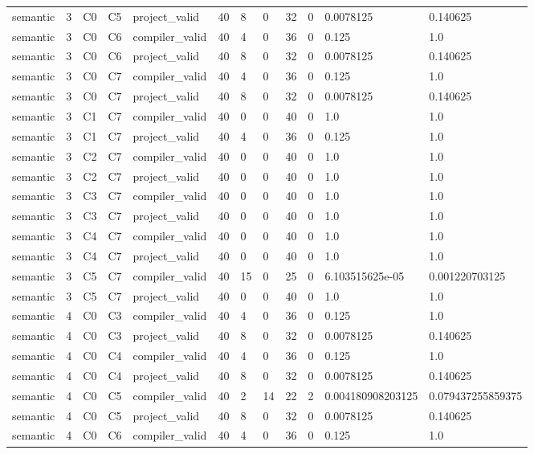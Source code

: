 \begin{tabular}{llllllllllll}
semantic & 3 & C0 & C5 & project\_valid & 40 & 8 & 0 & 32 & 0 & 0.0078125 & 0.140625 \\
semantic & 3 & C0 & C6 & compiler\_valid & 40 & 4 & 0 & 36 & 0 & 0.125 & 1.0 \\
semantic & 3 & C0 & C6 & project\_valid & 40 & 8 & 0 & 32 & 0 & 0.0078125 & 0.140625 \\
semantic & 3 & C0 & C7 & compiler\_valid & 40 & 4 & 0 & 36 & 0 & 0.125 & 1.0 \\
semantic & 3 & C0 & C7 & project\_valid & 40 & 8 & 0 & 32 & 0 & 0.0078125 & 0.140625 \\
semantic & 3 & C1 & C7 & compiler\_valid & 40 & 0 & 0 & 40 & 0 & 1.0 & 1.0 \\
semantic & 3 & C1 & C7 & project\_valid & 40 & 4 & 0 & 36 & 0 & 0.125 & 1.0 \\
semantic & 3 & C2 & C7 & compiler\_valid & 40 & 0 & 0 & 40 & 0 & 1.0 & 1.0 \\
semantic & 3 & C2 & C7 & project\_valid & 40 & 0 & 0 & 40 & 0 & 1.0 & 1.0 \\
semantic & 3 & C3 & C7 & compiler\_valid & 40 & 0 & 0 & 40 & 0 & 1.0 & 1.0 \\
semantic & 3 & C3 & C7 & project\_valid & 40 & 0 & 0 & 40 & 0 & 1.0 & 1.0 \\
semantic & 3 & C4 & C7 & compiler\_valid & 40 & 0 & 0 & 40 & 0 & 1.0 & 1.0 \\
semantic & 3 & C4 & C7 & project\_valid & 40 & 0 & 0 & 40 & 0 & 1.0 & 1.0 \\
semantic & 3 & C5 & C7 & compiler\_valid & 40 & 15 & 0 & 25 & 0 & 6.103515625e-05 & 0.001220703125 \\
semantic & 3 & C5 & C7 & project\_valid & 40 & 0 & 0 & 40 & 0 & 1.0 & 1.0 \\
semantic & 4 & C0 & C3 & compiler\_valid & 40 & 4 & 0 & 36 & 0 & 0.125 & 1.0 \\
semantic & 4 & C0 & C3 & project\_valid & 40 & 8 & 0 & 32 & 0 & 0.0078125 & 0.140625 \\
semantic & 4 & C0 & C4 & compiler\_valid & 40 & 4 & 0 & 36 & 0 & 0.125 & 1.0 \\
semantic & 4 & C0 & C4 & project\_valid & 40 & 8 & 0 & 32 & 0 & 0.0078125 & 0.140625 \\
semantic & 4 & C0 & C5 & compiler\_valid & 40 & 2 & 14 & 22 & 2 & 0.004180908203125 & 0.079437255859375 \\
semantic & 4 & C0 & C5 & project\_valid & 40 & 8 & 0 & 32 & 0 & 0.0078125 & 0.140625 \\
semantic & 4 & C0 & C6 & compiler\_valid & 40 & 4 & 0 & 36 & 0 & 0.125 & 1.0 \\

\end{tabular}
